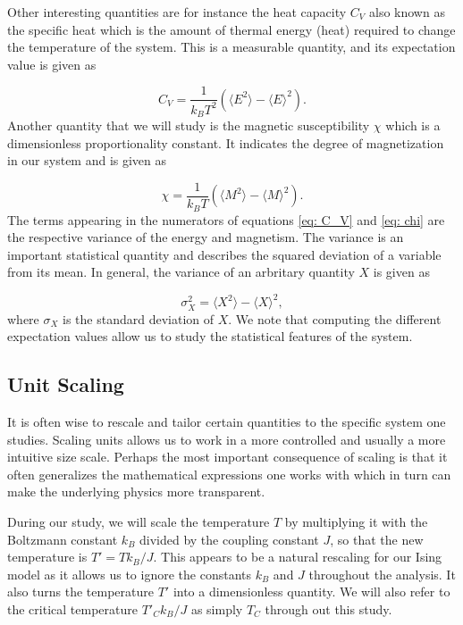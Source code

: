 \documentclass[a4paper, 10pt, reqno]{amsart}
\begin{document}
Other interesting quantities are for instance the heat capacity $C_V$ also
known as the specific heat which is the amount of thermal energy (heat)
required to change the temperature of the system. This is a measurable
quantity, and its expectation value is given as

\begin{equation}\label{eq: C_V}
    C _ { V } = \frac { 1 } { k _ { B } T ^ { 2 } } \left( \langle E^2 \rangle - \langle E \rangle^2 \right).
\end{equation}
Another quantity that we will study is the magnetic susceptibility $\chi$
which is a dimensionless proportionality constant. It indicates the degree of
magnetization in our system and is given as

\begin{equation}\label{eq: chi}
    \chi = \frac { 1 } { k _ { B } T } \left( \langle M^2 \rangle - \langle M \rangle^2 \right).
\end{equation}
The terms appearing in the numerators of equations \eqref{eq: C_V} and
\eqref{eq: chi} are the respective variance of the energy and magnetism. The
variance is an important statistical quantity and describes the squared
deviation of a variable from its mean. In general, the variance of an
arbritary quantity $X$ is given as

\begin{equation}\label{eq: var}
    \sigma^2_X = \langle X^2 \rangle - \langle X \rangle ^2,
\end{equation}
where $\sigma_X$ is the standard deviation of $X$. We note that computing the
different expectation values allow us to study the statistical features of
the system.

\subsection{Unit Scaling} It is often wise to rescale and tailor certain
quantities to the specific system one studies. Scaling units allows us to
work in a more controlled and usually a more intuitive size scale. Perhaps
the most important consequence of scaling is that it often generalizes the
mathematical expressions one works with which in turn can make the underlying
physics more transparent.

During our study, we will scale the temperature $T$ by multiplying it with
the Boltzmann constant $k_B$ divided by the coupling constant $J$, so that
the new temperature is $T' = T k_B/J$. This appears to be a natural
rescaling for our Ising model as it allows us to ignore the constants $k_B$
and $J$ throughout the analysis. It also turns the temperature $T'$ into a
dimensionless quantity. We will also refer to the critical temperature $T'_C k_B /J$ as simply $T_C$ through out this study.
\end{document}

